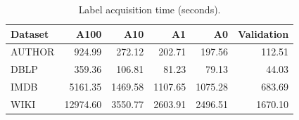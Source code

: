\begin{table}[!t]
\centering
\small
\setlength{\tabcolsep}{1.5pt}
\caption{Label acquisition time (seconds).}
\label{tab:label-acquisition}
\begin{tabular*}{\columnwidth}{@{\extracolsep{\fill}}lrrrrr@{}}
\toprule
Dataset & A100 & A10 & A1 & A0 & Validation \\
\midrule
AUTHOR & 924.99 & 272.12 & 202.71 & 197.56 & 112.51 \\
DBLP & 359.36 & 106.81 & 81.23 & 79.13 & 44.03 \\
IMDB & 5161.35 & 1469.58 & 1107.65 & 1075.28 & 683.69 \\
WIKI & 12974.60 & 3550.77 & 2603.91 & 2496.51 & 1670.10 \\
\bottomrule
\end{tabular*}
\end{table}
